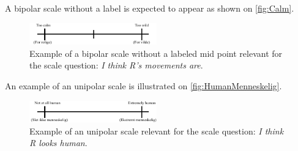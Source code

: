 \noindent
% 
A bipolar scale without a label is expected to appear as shown on \autoref{fig:Calm}.  
%
\begin{figure}[H]
\centering
\includegraphics[width = 0.49\textwidth]{Figure/CalmWild} 
\caption{Example of a bipolar scale without a labeled mid point relevant for the scale question: \textit{I think R's movements are}.}
\label{fig:Calm}
\end{figure}
\noindent
%
An example of an unipolar scale is illustrated on \autoref{fig:HumanMenneskelig}.
%
\begin{figure}[H]
\centering
\includegraphics[width = 0.49\textwidth]{Figure/HumanMenneskelig} 
\caption{Example of an unipolar scale relevant for the scale question: \textit{I think R looks human}.}
\label{fig:HumanMenneskelig}
\end{figure}
\noindent
%
